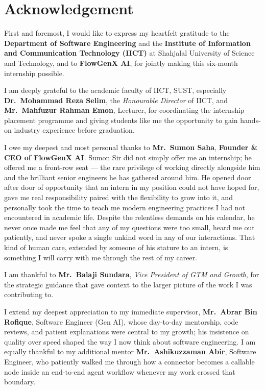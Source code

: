 \chapter*{Acknowledgement}

\begingroup
{}

First and foremost, I would like to express my heartfelt gratitude to the
\textbf{Department of Software Engineering} and the \textbf{Institute of
Information and Communication Technology (IICT)} at Shahjalal University
of Science and Technology, and to \textbf{FlowGenX AI}, for jointly
making this six-month internship possible.

I am deeply grateful to the academic faculty of IICT, SUST, especially
\textbf{Dr.~Mohammad Reza Selim}, the \emph{Honourable Director} of
IICT, and \textbf{Mr.~Mahfuzur Rahman Emon}, Lecturer, for coordinating
the internship placement programme and giving students like me the
opportunity to gain hands-on industry experience before graduation.

I owe my deepest and most personal thanks to \textbf{Mr.~Sumon Saha},
\textbf{Founder \& CEO of FlowGenX AI}. Sumon Sir did not simply offer
me an internship; he offered me a front-row seat --- the rare privilege
of working directly alongside him and the brilliant senior engineers
he has gathered around him. He opened door after door of opportunity
that an intern in my position could not have hoped for, gave me real
responsibility paired with the flexibility to grow into it, and
personally took the time to teach me modern engineering practices I
had not encountered in academic life. Despite the relentless demands
on his calendar, he never once made me feel that any of my questions
were too small, heard me out patiently, and never spoke a single
unkind word in any of our interactions. That kind of human care,
extended by someone of his stature to an intern, is something I will
carry with me through the rest of my career.

I am thankful to \textbf{Mr.~Balaji Sundara}, \emph{Vice President of
GTM and Growth}, for the strategic guidance that gave context to the
larger picture of the work I was contributing to.

I extend my deepest appreciation to my immediate supervisor,
\textbf{Mr.~Abrar Bin Rofique}, Software Engineer (Gen AI), whose
day-to-day mentorship, code reviews, and patient explanations were
central to my growth; his insistence on quality over speed shaped the
way I now think about software engineering. I am equally thankful to my
additional mentor \textbf{Mr.~Ashikuzzaman Abir}, Software Engineer,
who patiently walked me through how a connector becomes a callable
node inside an end-to-end agent workflow whenever my work crossed
that boundary.

